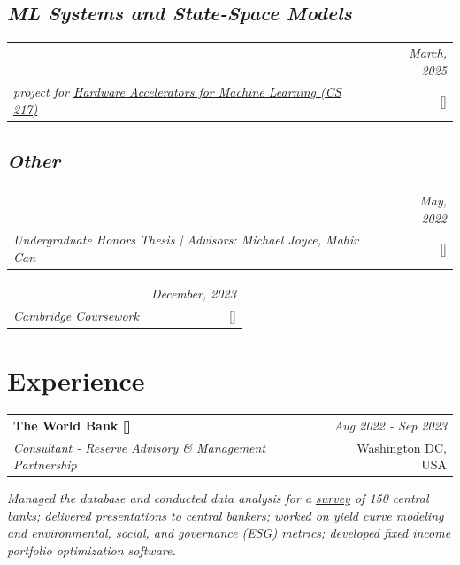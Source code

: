 \documentclass[a4paper,11pt]{article}
\makeatletter
\newcommand{\resumeSubheading}[4]{
\vspace{0.5mm}
    \begin{tabular*}{0.98\textwidth}[t]{l@{\extracolsep{\fill}}r}
        \textbf{#1} & \textit{\footnotesize{#4}} \\
        \textit{\footnotesize{#3}} &  \footnotesize{#2}\\
    \end{tabular*}
    \vspace{-1mm}
}
\newcommand{\resumeProject}[4]{
\vspace{0mm}
    \begin{tabular*}{0.98\textwidth}[t]{l@{\extracolsep{\fill}}r}
        \text{#1} & \textit{\footnotesize{#3}} \\
        \footnotesize{\textit{#2}} & \footnotesize{#4}
    \end{tabular*}
    \vspace{-0mm}
}
\makeatother
\begin{document}
\subsection*{\textit{ML Systems and State-Space Models}}
\vspace{-2mm}
\resumeProject
  {Toward Faster Mamba Kernels: Performance Improvements and Hardware Limits}
  {project for \href{https://cs217.stanford.edu/}{Hardware Accelerators for Machine Learning (CS 217)}}
  {March, 2025}
  {{}[\href{https://github.com/batu-el/faster-mamba}{\textcolor{darkblue}{\faGithub}}]}
\vspace{-4mm}
\subsection*{\textit{Other}}
\vspace{-2mm}
\resumeProject
  {Parameterizing Chains in Generalized Fixed-Point-Free Involutions}
  {Undergraduate Honors Thesis | Advisors: Michael Joyce, Mahir Can}
  {May, 2022}
  {{}[\href{https://github.com/batu-el/parameterizing-chains-in-generalized-involutions}{\textcolor{darkblue}{\faGithub}}]}
\resumeProject
  {Comparative Analysis of Constituency Parsers: A Case Study on Stanford U-PCFG and Berkeley Neural Parsers}
  {Cambridge Coursework}
  {December, 2023}
  {{}[\href{https://github.com/batu-el/constituency-parser-comparison}{\textcolor{darkblue}{\faGithub}}]}
\vspace{-4mm}
\section{\textbf{Experience}}
\vspace{-0.4mm}
  \resumeSubheading
      {{The World Bank [\href{https://treasury.worldbank.org/en/about/unit/treasury/reserve-advisory-management-partnership}{\faIcon{globe}}]}}{Washington DC, USA}
      {Consultant - Reserve Advisory \& Management Partnership}{Aug 2022 - Sep 2023}
       \vspace{2mm}
        \textit{Managed the database and conducted data analysis for a \href{https://openknowledge.worldbank.org/entities/publication/3e23f0dd-7849-4a55-8ce7-2a104bef2c68}{survey} of 150 central banks; delivered presentations to central bankers; worked on yield curve modeling and environmental, social, and governance (ESG) metrics; developed fixed income portfolio optimization software.}
       \vspace{2mm}
\end{document}
